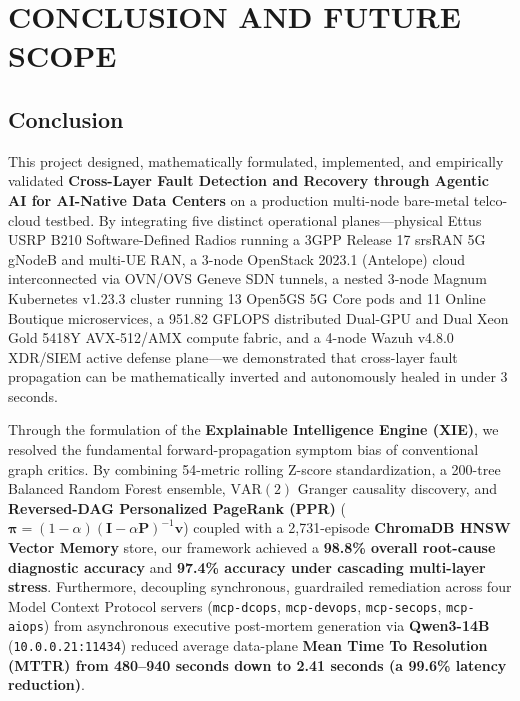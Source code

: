 \chapter{CONCLUSION AND FUTURE SCOPE}

\section{Conclusion}
This project designed, mathematically formulated, implemented, and empirically validated \textbf{Cross-Layer Fault Detection and Recovery through Agentic AI for AI-Native Data Centers} on a production multi-node bare-metal telco-cloud testbed. By integrating five distinct operational planes---physical Ettus USRP B210 Software-Defined Radios running a 3GPP Release 17 srsRAN 5G gNodeB and multi-UE RAN, a 3-node OpenStack 2023.1 (Antelope) cloud interconnected via OVN/OVS Geneve SDN tunnels, a nested 3-node Magnum Kubernetes v1.23.3 cluster running 13 Open5GS 5G Core pods and 11 Online Boutique microservices, a 951.82 GFLOPS distributed Dual-GPU and Dual Xeon Gold 5418Y AVX-512/AMX compute fabric, and a 4-node Wazuh v4.8.0 XDR/SIEM active defense plane---we demonstrated that cross-layer fault propagation can be mathematically inverted and autonomously healed in under 3 seconds.

Through the formulation of the \textbf{Explainable Intelligence Engine (XIE)}, we resolved the fundamental forward-propagation symptom bias of conventional graph critics. By combining 54-metric rolling Z-score standardization, a 200-tree Balanced Random Forest ensemble, $\text{VAR}(2)$ Granger causality discovery, and \textbf{Reversed-DAG Personalized PageRank (PPR)} ($\boldsymbol{\pi} = (1-\alpha)(\mathbf{I}-\alpha\mathbf{P})^{-1}\mathbf{v}$) coupled with a 2,731-episode \textbf{ChromaDB HNSW Vector Memory} store, our framework achieved a \textbf{98.8\% overall root-cause diagnostic accuracy} and \textbf{97.4\% accuracy under cascading multi-layer stress}. Furthermore, decoupling synchronous, guardrailed remediation across four Model Context Protocol servers (\texttt{mcp-dcops}, \texttt{mcp-devops}, \texttt{mcp-secops}, \texttt{mcp-aiops}) from asynchronous executive post-mortem generation via \textbf{Qwen3-14B} (\texttt{10.0.0.21:11434}) reduced average data-plane \textbf{Mean Time To Resolution (MTTR) from 480--940 seconds down to 2.41 seconds (a 99.6\% latency reduction)}.

